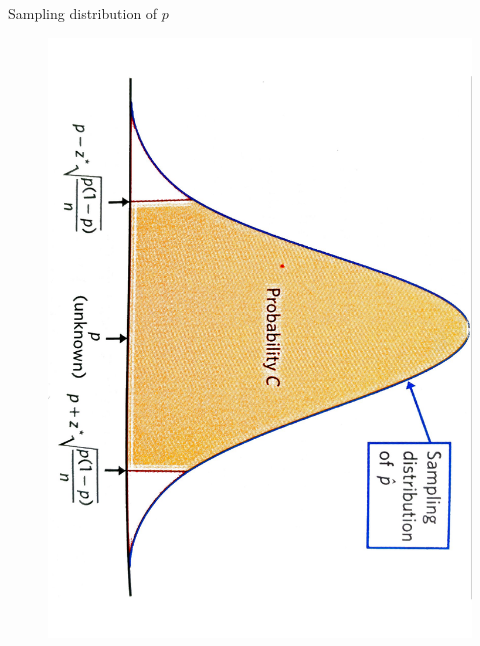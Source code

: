 \documentclass{beamer}\usepackage[]{graphicx}\usepackage[]{color}
\begin{document}
\begin{frame}{Sampling distribution of $p$}

\begin{center}
	\begin{figure}
\includegraphics[scale=0.3,angle=90]{prop1.pdf}
	\end{figure}
\end{center}

\end{frame}
\end{document}
